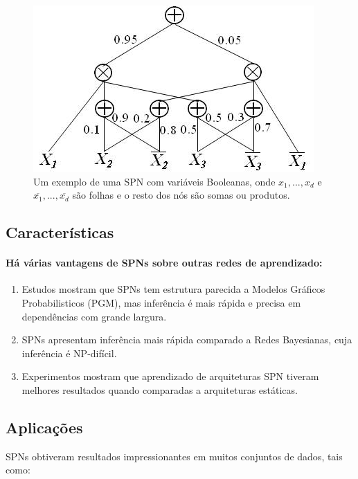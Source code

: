 \documentclass[a4paper,10pt]{article}
\theoremstyle{plain}
\begin{document}
\begin{figure}[h]
\centering\includegraphics[scale=0.7]{imgs/domingos_poon.jpg}
\caption{Um exemplo de uma SPN com variáveis Booleanas, onde $x_1,...,x_d$ e 
  $\overline{x_1},...,\overline{x_d}$ são folhas e o resto dos nós são somas ou produtos.\cite{poon-domingos}}
\end{figure}

\subsection{Características}

\paragraph{
  Há várias vantagens de SPNs sobre outras redes de aprendizado:
}

\begin{enumerate} \itemsep0pt
  \item Estudos mostram que SPNs tem estrutura parecida a Modelos Gráficos Probabilisticos (PGM), 
    mas inferência é mais rápida e precisa em dependências com grande largura.\cite{gens-domingos}
  \item SPNs apresentam inferência mais rápida comparado a Redes Bayesianas, cuja inferência é
    NP-difícil.
  \item Experimentos mostram que aprendizado de arquiteturas SPN tiveram melhores resultados quando
    comparadas a arquiteturas estáticas.\cite{clustering}
\end{enumerate}

\subsection{Aplicações}

SPNs obtiveram resultados impressionantes em muitos conjuntos de dados\cite{website:spn-uwashington}, tais como:
\end{document}
